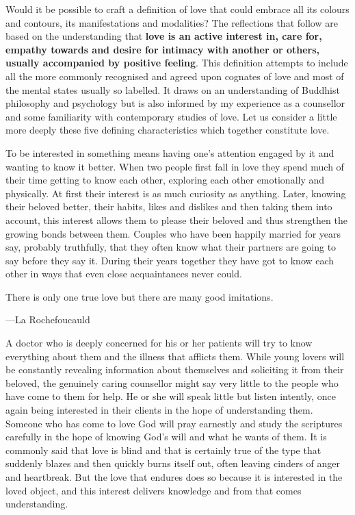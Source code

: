 \documentclass[10pt, openright]{book}
\newenvironment{epigram-2}%
{%
\vspace{1em}
\noindent
\quoting[leftmargin=2.5cm,rightmargin=2.5cm]%
\begin{itshape}
\large
}%
{\end{itshape}\endquoting
}%
\newenvironment{epigram-2-cite}%
{%
\quoting[leftmargin=2.5cm,rightmargin=2.5cm]%
\noindent\normal\hspace*{\fill} 
}%
{\endquoting\vspace{1em}
}%
\begin{document}
Would it be possible to craft a definition of love that could embrace all its colours and contours, its manifestations and modalities? The reflections that follow are based on the understanding that \textbf{love is an active interest in, care for, empathy towards and desire for intimacy with another or others, usually accompanied by positive feeling}. This definition attempts to include all the more commonly recognised and agreed upon cognates of love and most of the mental states usually so labelled. It draws on an understanding of Buddhist philosophy and psychology but is also informed by my experience as a counsellor and some familiarity with contemporary studies of love. Let us consider a little more deeply these five defining characteristics which together constitute love.


To be interested in something means having one’s attention engaged by it and wanting to know it better. When two people first fall in love they spend much of their time getting to know each other, exploring each other emotionally and physically. At first their interest is as much curiosity as anything. Later, knowing their beloved better, their habits, likes and dislikes and then taking them into account, this interest allows them to please their beloved and thus strengthen the growing bonds between them. Couples who have been happily married for years say, probably truthfully, that they often know what their partners are going to say before they say it. During their years together they have got to know each other in ways that even close acquaintances never could.


\begin{epigram-2}
There is only one true love but there are many good imitations.
\end{epigram-2}

\begin{epigram-2-cite}
—La Rochefoucauld
\end{epigram-2-cite}

A doctor who is deeply concerned for his or her patients will try to know everything about them and the illness that afflicts them. While young lovers will be constantly revealing information about themselves and soliciting it from their beloved, the genuinely caring counsellor might say very little to the people who have come to them for help. He or she will speak little but listen intently, once again being interested in their clients in the hope of understanding them. Someone who has come to love God will pray earnestly and study the scriptures carefully in the hope of knowing God’s will and what he wants of them. It is commonly said that love is blind and that is certainly true of the type that suddenly blazes and then quickly burns itself out, often leaving cinders of anger and heartbreak. But the love that endures does so because it is interested in the loved object, and this interest delivers knowledge and from that comes understanding.
\end{document}
